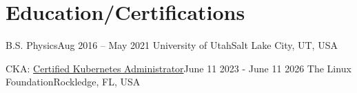 \section{Education/Certifications}
\mySubHeadingListStart

  \mySubHeading
    {B.S. Physics}{Aug 2016 -- May 2021}
    {University of Utah}{Salt Lake City, UT, USA}
    \myItemListStart
    \myItemListEnd

  \mySubHeading
    {CKA: \href{https://www.credly.com/badges/41df09f4-c35c-4d07-9093-851e3eb401ba/public_url}{\textcolor{linkcolor}{Certified Kubernetes Administrator}}}{June 11 2023 - June 11 2026}
    {The Linux Foundation}{Rockledge, FL, USA}
    \hfill

\mySubHeadingListEnd
